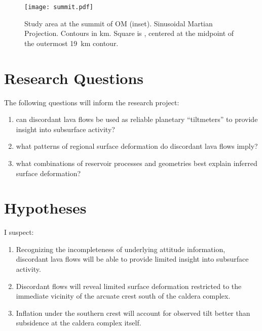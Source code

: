 \begin{figure}
    \centering
    \texttt{[image: summit.pdf]}
    \caption[Study area: \acl{OM} summit]{Study area at the summit of \acl{OM} (inset). Sinusoidal Martian Projection. Contours in \unit{km}. Square is , centered at the midpoint of the outermost \qty{19}{\km} contour.}\label{fig:summit}
\end{figure}

\section{Research Questions}

The following questions will inform the research project: 
\begin{enumerate}
    \item can discordant lava flows be used as reliable planetary ``tiltmeters'' to provide insight into subsurface activity?
    \item what patterns of regional surface deformation do discordant lava flows imply?
    \item what combinations of reservoir processes and geometries best explain inferred surface deformation?
\end{enumerate}

\section{Hypotheses}

I suspect:
\begin{enumerate}
    \item Recognizing the incompleteness of underlying attitude information, discordant lava flows will be able to provide limited insight into subsurface activity.
    \item Discordant flows will reveal limited surface deformation restricted to the immediate vicinity of the arcuate crest south of the caldera complex.
    \item Inflation under the southern crest will account for observed tilt better than subsidence at the caldera complex itself. 
\end{enumerate}

